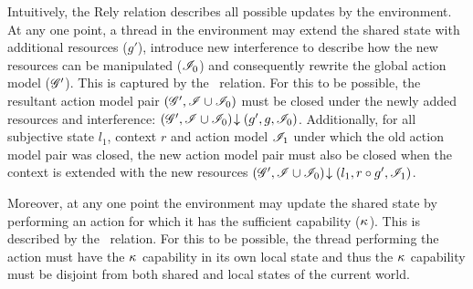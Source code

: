 %
%
Intuitively, the Rely relation describes all possible updates by the environment. At any one point, a thread in the environment may extend the shared state with additional resources ($g'$), introduce new interference to describe how the new resources can be manipulated ($\mathscr{I}_0$) and consequently rewrite the global action model ($\mathscr{G}'$). This is captured by the \extendR\ relation. For this to be possible, the resultant action model pair $(\mathscr{G}', \mathscr{I} \cup \mathscr{I}_0)$ must be closed under the newly added resources and interference: $\left(\mathscr{G}', \mathscr{I} \cup \mathscr{I}_0\right) \!\downarrow \left(g', g, \mathscr{I}_0\right)$. Additionally, for all subjective state $l_1$, context $r$ and action model $\mathscr{I}_1$ under which the old action model pair was closed, the new action model pair must also  be closed when the context is extended with the new resources $\left(\mathscr{G}', \mathscr{I} \cup \mathscr{I}_0\right) \!\downarrow \left(l_1, r \circ g', \mathscr{I}_1\right)$. 

Moreover, at any one point the environment may update the shared state by performing an action for which it has the sufficient capability ($\kappa_{}$). This is described by the \updateR\ relation. For this to be possible, the thread performing the action must have the $\kappa_{}$ capability in its own local state and thus the $\kappa_{}$ capability must be disjoint from both shared and local states of the current world. 

